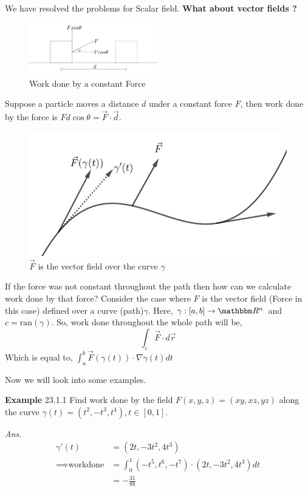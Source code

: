 \documentclass[Analysis-3]{subfiles}
\begin{document}
We have resolved the problems for Scalar field.\textbf{ What about vector fields ?}
\begin{figure}[H]
    \centering
    \includegraphics[width=0.5\textwidth]{figures/lec-23.2.png}
    \caption{Work done by a constant Force}
\end{figure}
Suppose a particle moves a distance $d$ under a constant force $F$, then work done by the force is $Fd\cos{\theta} = \vec{F}\cdot\vec{d}$.


\begin{figure}
    \centering
    \includegraphics[width=.98\linewidth]{figures/lec-23.3.png}
    \caption{$\vec{F}$ is the vector field over the curve $\gamma$}
\end{figure}

If the force was not constant throughout the path then how can we calculate work done by that force?
Consider the case where $F$ is the vector field (Force in this case) defined over a curve (path)$\gamma$. Here, $\gamma : [a,b] \to \R^n$ and $c = \text{ran}(\gamma)$. So, work done throughout the whole path will be,
\[\int_c \vec{F}\cdot d\vec{r}\]
Which is equal to, $\int_a^b \vec{F}(\gamma(t))\cdot \nabla \gamma(t) dt$

Now we will look into some examples.
\vspace{0.3cm}

\textbf{Example} 23.1.1  Find work done by the field $F(x,y,z) = (xy,xz,yz)$ along the curve $\gamma(t) = (t^2,-t^3,t^4),t \in [0,1]$.

\textit{Ans.} \begin{align*}
    \gamma'(t)               & = (2t,-3t^2,4t^3)                                 \\
    \implies \text{workdone} & = \int_0^1 (-t^5,t^6,-t^7)\cdot(2t,-3t^2,4t^3) dt \\
                             & = -\frac{31}{88}
\end{align*}
\end{document}
